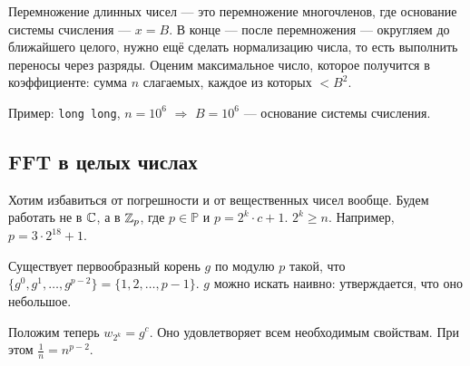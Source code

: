 Перемножение длинных чисел --- это перемножение многочленов, где основание системы счисления --- $x=B$.
В конце --- после перемножения --- округляем до ближайшего целого, нужно ещё сделать нормализацию числа, то есть выполнить переносы через разряды.
Оценим максимальное число, которое получится в коэффициенте: сумма $n$ слагаемых, каждое из которых $<B^2$.

Пример: \texttt{long long}, $n=10^6$ $\Longrightarrow$ $B=10^6$ --- основание системы счисления.


\subsection{FFT в целых числах}

Хотим избавиться от погрешности и от вещественных чисел вообще. Будем работать не в $\mathbb{C}$, а в $\mathbb{Z}_p$, где $p\in\mathbb{P}$ и $p=2^k\cdot c+1$. $2^k\ge n$.
Например, $p=3\cdot 2^{18}+1$.

Существует первообразный корень $g$ по модулю $p$ такой, что $\{g^0,g^1,\dots,g^{p-2}\}=\{1,2,\dots,p-1\}$.
$g$ можно искать наивно: утверждается, что оно небольшое.

Положим теперь $w_{2^k}=g^c$. Оно удовлетворяет всем необходимым свойствам. При этом $\frac{1}{n}=n^{p-2}$.